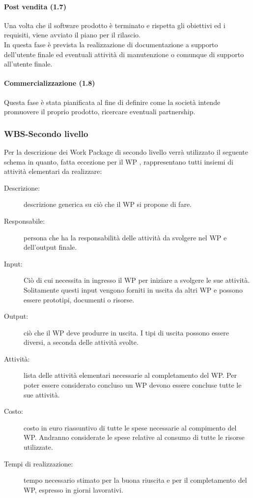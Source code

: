 \paragraph{Post vendita (1.7)}
Una volta che il software prodotto è terminato e rispetta gli obiettivi ed i requisiti, viene avviato il piano per il rilascio.\\
In questa fase è prevista la realizzazione di documentazione a supporto dell'utente finale ed eventuali attività di manutenzione o comunque di supporto all'utente finale.\\

\paragraph{Commercializzazione (1.8)}
Questa fase è stata pianificata al fine di definire come la società intende promuovere il proprio prodotto, ricercare eventuali partnership.

\subsubsection {WBS-Secondo livello}
Per la descrizione dei Work Package di secondo livello verrà utilizzato il seguente schema in quanto, fatta eccezione per il WP %
, rappresentano tutti insiemi di attività elementari da realizzare:
\begin{description}
\item[Descrizione:] descrizione generica su ciò che il WP si propone di fare.
\item[Responsabile:] persona che ha la responsabilità delle attività da svolgere nel WP e dell'output finale.
\item[Input:] Ciò di cui necessita in ingresso il WP per iniziare a svolgere le sue attività. Solitamente questi input vengono forniti in uscita da altri WP e possono essere prototipi, documenti o risorse.
\item[Output:] ciò che il WP deve produrre in uscita. I tipi di uscita possono essere diversi, a seconda delle attività svolte.
\item[Attività:] lista delle attività elementari necessarie al completamento del WP. Per poter essere considerato concluso un WP devono essere concluse tutte le sue attività.
\item[Costo:] costo in euro riassuntivo di tutte le spese necessarie al compimento del WP. Andranno considerate le spese relative al consumo di tutte le risorse utilizzate.
\item[Tempi di realizzazione:] tempo necessario stimato per la buona riuscita e per il completamento del WP, espresso in giorni lavorativi.
\end{description}

